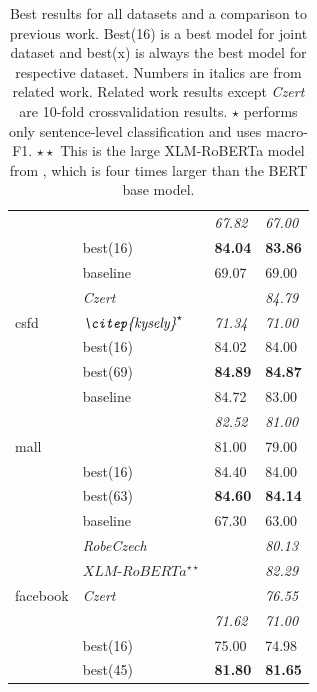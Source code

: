 \begin{table}[!h]
\begin{tabular}{|l|l||ll|}
                           & \textit{\citep{kysely}} & \textit{67.82} & \textit{67.00} \\ \cline{2-4}
                           & best(16)    & \textbf{84.04} & \textbf{83.86} \\ \hline \hline
\multirow{5}{*}{csfd}      & baseline    & 69.07 & 69.00 \\ \cline{2-4} 
& \textit{Czert}       &       & \textit{84.79} \\ \cline{2-4} 
& $\textit{\citep{kysely}}^\star$ & \textit{71.34} & \textit{71.00} \\ \cline{2-4}
                           & best(16)    & 84.02 & 84.00\\ \cline{2-4} 
                           & best(69)    & \textbf{84.89 }& \textbf{84.87} \\ \hline \hline
\multirow{5}{*}{mall}      & baseline    & 84.72 & 83.00 \\ \cline{2-4} 
& \textit{\citep{kysely}} & \textit{82.52} & \textit{81.00} \\ \cline{2-4}
& \textit{\citep{Klouda}} & 81.00 & 79.00 \\ \cline{2-4}
                           & best(16)    & 84.40 & 84.00 \\ \cline{2-4} 
                           & best(63)    & \textbf{84.60} & \textbf{84.14} \\ \hline \hline
\multirow{7}{*}{facebook}  & baseline    & 67.30 & 63.00 \\ \cline{2-4} 
& \textit{RobeCzech }  &       & \textit{80.13} \\ \cline{2-4} 
& $\textit{XLM-RoBERTa}^{\star\star}$ &       & \textit{82.29} \\ \cline{2-4} 
& \textit{Czert}       &       & \textit{76.55} \\ \cline{2-4} 
& \textit{\citep{kysely}} & \textit{71.62} & \textit{71.00} \\ \cline{2-4}
                           & best(16)    & 75.00 & 74.98 \\ \cline{2-4} 
                           & best(45)    & \textbf{81.80} & \textbf{81.65} \\ \hline
\end{tabular}
\caption[Best results and comparison to previous work]{Best results for all datasets and a comparison to previous work. Best(16) is a best model for joint dataset and best(x) is always the best model for respective dataset. Numbers in italics are from related work. Related work results except \textit{Czert} are 10-fold crossvalidation results. $\star$ \citep{kysely} performs only sentence-level classification and uses macro-F1. $\star\star$ This is the large XLM-RoBERTa model from \citet{Straka2021}, which is four times larger than the BERT base model.}
\label{tab:res_sent_best}
\end{table}

